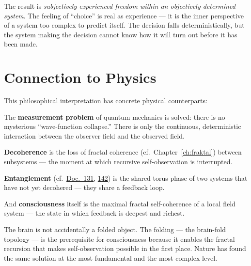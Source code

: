 The result is \emph{subjectively experienced freedom within an objectively determined system}. The feeling of ``choice'' is real as experience --- it is the inner perspective of a system too complex to predict itself. The decision falls deterministically, but the system making the decision cannot know how it will turn out before it has been made.

\section{Connection to Physics}

This philosophical interpretation has concrete physical counterparts:

The \textbf{measurement problem} of quantum mechanics is solved: there is no mysterious ``wave-function collapse.'' There is only the continuous, deterministic interaction between the observer field and the observed field.

\textbf{Decoherence} is the loss of fractal coherence (cf.\ Chapter~\ref{ch:fraktal}) between subsystems --- the moment at which recursive self-observation is interrupted.

\textbf{Entanglement} (cf.\ \href{https://github.com/jpascher/T0-Time-Mass-Duality/blob/main/2/pdf/131_scheinbar_instantan_De.pdf}{Doc.~131}, \href{https://github.com/jpascher/T0-Time-Mass-Duality/blob/main/2/pdf/142_Experimet-verschraenkung_De.pdf}{142}) is the shared torus phase of two systems that have not yet decohered --- they share a feedback loop.

And \textbf{consciousness} itself is the maximal fractal self-coherence of a local field system --- the state in which feedback is deepest and richest.

\begin{kerngedanke}
The brain is not accidentally a folded object. The folding --- the brain-fold topology --- is the prerequisite for consciousness because it enables the fractal recursion that makes self-observation possible in the first place. Nature has found the same solution at the most fundamental and the most complex level.
\end{kerngedanke}
